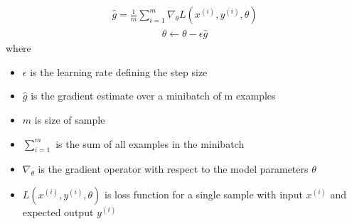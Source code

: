 \begin{align}
	\hat{g} = \frac{1}{m} \sum_{i=1}^{m} \nabla_{\theta} L(x^{(i)}, y^{(i)},\theta)
\end{align}
\begin{align}
	\theta \leftarrow \theta - \epsilon \hat{g}
\end{align}
where 
\begin{itemize}
	\item $\epsilon$ is the learning rate defining the step size
	\item $\hat{g}$ is the gradient estimate over a minibatch of m examples
	\item $m$ is size of sample
	\item $\sum_{i=1}^{m}$ is the sum of all examples in the minibatch
	\item $\nabla_{\theta}$ is the gradient operator with respect to the model parameters $\theta$
	\item $L(x^{(i)}, y^{(i)},\theta)$ is loss function for a single sample with input $x^{(i)}$ and expected output $y^{(i)}$
\end{itemize}

	
